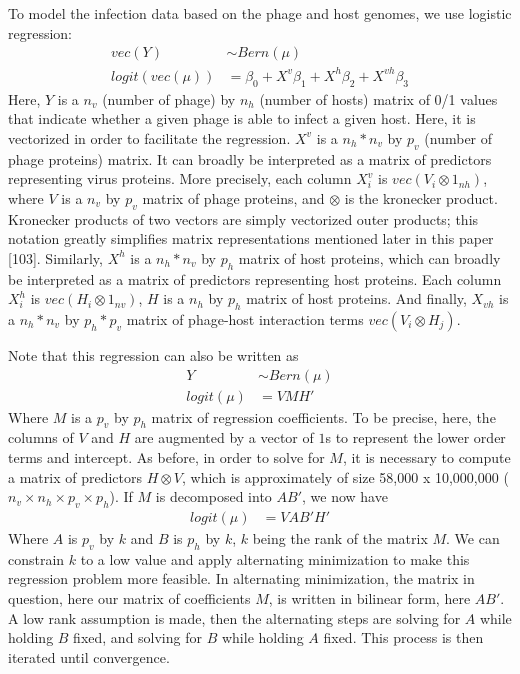 \documentclass[12pt,twoside]{mitthesis-manusdown}
\begin{document}
To model the infection data based on the phage and host genomes, we use
logistic regression:
\begin{align*} 
vec(Y)           & \sim  Bern( \mu ) \\ 
logit(vec(\mu))  & = \beta_0 + X^v \beta_1 + X^h \beta_2 + X^{vh} \beta_3
\end{align*}
Here, \(Y\) is a \(n_v\) (number of phage) by \(n_h\) (number of hosts)
matrix of 0/1 values that indicate whether a given phage is able to
infect a given host. Here, it is vectorized in order to facilitate the
regression. \(X^v\) is a \(n_h*n_v\) by \(p_v\) (number of phage
proteins) matrix. It can broadly be interpreted as a matrix of
predictors representing virus proteins. More precisely, each column
\(X^v_i\) is \(vec(V_i \otimes 1_{nh})\), where \(V\) is a \(n_v\) by
\(p_v\) matrix of phage proteins, and \(\otimes\) is the kronecker
product. Kronecker products of two vectors are simply vectorized outer
products; this notation greatly simplifies matrix representations
mentioned later in this paper {[}103{]}. Similarly, \(X^h\) is a
\(n_h*n_v\) by \(p_h\) matrix of host proteins, which can broadly be
interpreted as a matrix of predictors representing host proteins. Each
column \(X^h_i\) is \(vec(H_i \otimes 1_{nv})\), \(H\) is a \(n_h\) by
\(p_h\) matrix of host proteins. And finally, \(X_{vh}\) is a
\(n_h*n_v\) by \(p_h*p_v\) matrix of phage-host interaction terms
\(vec(V_i \otimes H_j)\).

Note that this regression can also be written as
\begin{align*} 
Y           & \sim  Bern( \mu ) \\ 
logit(\mu)  &=     VMH'
\end{align*}
Where \(M\) is a \(p_v\) by \(p_h\) matrix of regression coefficients.
To be precise, here, the columns of \(V\) and \(H\) are augmented by a
vector of \(1\)s to represent the lower order terms and intercept. As
before, in order to solve for \(M\), it is necessary to compute a matrix
of predictors \(H \otimes V\), which is approximately of size 58,000 x
10,000,000 (\(n_v \times n_h \times p_v \times p_h\)). If \(M\) is
decomposed into \(AB'\), we now have
\begin{align*} 
logit(\mu)  &=     VAB'H'
\end{align*}
Where \(A\) is \(p_v\) by \(k\) and \(B\) is \(p_h\) by \(k\), \(k\)
being the rank of the matrix \(M\). We can constrain \(k\) to a low
value and apply alternating minimization to make this regression problem
more feasible. In alternating minimization, the matrix in question, here
our matrix of coefficients \(M\), is written in bilinear form, here
\(AB'\). A low rank assumption is made, then the alternating steps are
solving for \(A\) while holding \(B\) fixed, and solving for \(B\) while
holding \(A\) fixed. This process is then iterated until convergence.
\end{document}
